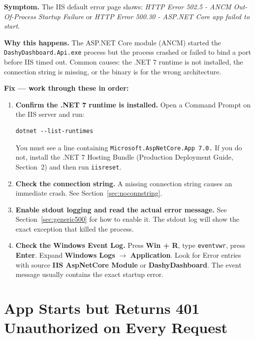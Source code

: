 \documentclass[a4paper,11pt]{article}
\begin{document}
\textbf{Symptom.}
The IIS default error page shows:
\emph{HTTP Error 502.5 - ANCM Out-Of-Process Startup Failure}
or \emph{HTTP Error 500.30 - ASP.NET Core app failed to start}.

\textbf{Why this happens.}
The ASP.NET Core module (ANCM) started the \texttt{DashyDashboard.Api.exe} process
but the process crashed or failed to bind a port before IIS timed out.
Common causes: the .NET 7 runtime is not installed, the connection string is missing,
or the binary is for the wrong architecture.

\textbf{Fix --- work through these in order:}

\begin{enumerate}
  \item \textbf{Confirm the .NET 7 runtime is installed.}
        Open a Command Prompt on the IIS server and run:
\begin{lstlisting}
dotnet --list-runtimes
\end{lstlisting}
        You must see a line containing \texttt{Microsoft.AspNetCore.App 7.0.}
        If you do not, install the .NET 7 Hosting Bundle
        (Production Deployment Guide, Section~2)
        and then run \texttt{iisreset}.
  \item \textbf{Check the connection string.}
        A missing connection string causes an immediate crash.
        See Section~\ref{sec:noconnstring}.
  \item \textbf{Enable stdout logging and read the actual error message.}
        See Section~\ref{sec:generic500} for how to enable it.
        The stdout log will show the exact exception that killed the process.
  \item \textbf{Check the Windows Event Log.}
        Press \textbf{Win + R}, type \texttt{eventvwr}, press \textbf{Enter}.
        Expand \textbf{Windows Logs} $\rightarrow$ \textbf{Application}.
        Look for Error entries with source \textbf{IIS AspNetCore Module}
        or \textbf{DashyDashboard}.
        The event message usually contains the exact startup error.
\end{enumerate}

\section{App Starts but Returns 401 Unauthorized on Every Request}
\label{sec:401}
\end{document}
